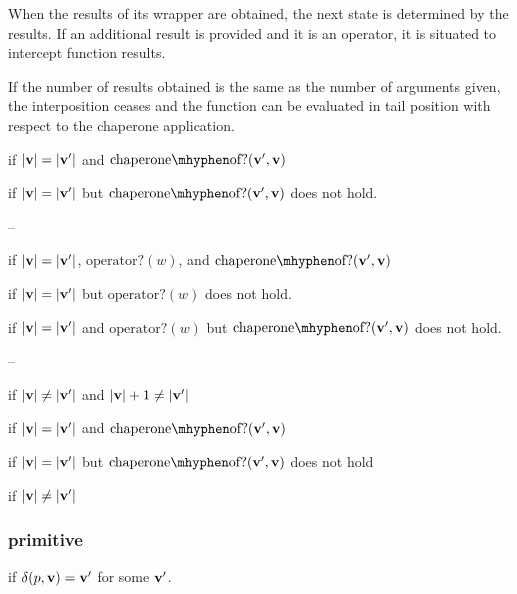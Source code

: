 When the results of its wrapper are obtained, the next state is determined by the results.
If an additional result is provided and it is an operator, it is situated to intercept function results.

If the number of results obtained is the same as the number of arguments given, the interposition ceases and the function can be evaluated in tail position with respect to the chaperone application.

if $|\mathbf{v}|=|\mathbf{v'}|$ and $\mathrm{chaperone\mhyphen of?}(\vvp,\vv)$

if $|\mathbf{v}|=|\mathbf{v'}|$ but $\mathrm{chaperone\mhyphen of?}(\vvp,\vv)$ does not hold.

--

if $|\mathbf{v}|=|\mathbf{v'}|$, $\mathrm{operator?}(w)$, and $\mathrm{chaperone\mhyphen of?}(\vvp,\vv)$

if $|\mathbf{v}|=|\mathbf{v'}|$ but $\mathrm{operator?}(w)$ does not hold.

if $|\mathbf{v}|=|\mathbf{v'}|$ and $\mathrm{operator?}(w)$ but $\mathrm{chaperone\mhyphen of?}(\vvp,\vv)$ does not hold.

--

if $|\mathbf{v}|\ne|\mathbf{v'}|$ and $|\mathbf{v}|+1\ne|\mathbf{v'}|$







\red{\sval{\chacrk{\vv}::\ks}{\sigma}{\vvp}}{\sval{\ks}{\sigma}{\vvp}}
if $|\mathbf{v}|=|\mathbf{v'}|$ and $\mathrm{chaperone\mhyphen of?}(\vvp,\vv)$

if $|\mathbf{v}|=|\mathbf{v'}|$ but $\mathrm{chaperone\mhyphen of?}(\vvp,\vv)$ does not hold

if $|\mathbf{v}|\ne|\mathbf{v'}|$

\subsubsection{primitive}
if $\delta(p,\mathbf{v})=\mathbf{v'}$ for some $\mathbf{v'}$.

